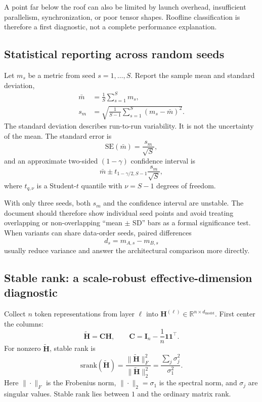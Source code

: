\documentclass[11pt,a4paper]{article}
\theoremstyle{definition}
\theoremstyle{plain}
\newcommand{\mC}{\bm{C}}
\newcommand{\mI}{\bm{I}}
\newcommand{\mH}{\bm{H}}
\newcommand{\reals}{\mathbb{R}}
\newcommand{\dmodel}{d_{\mathrm{model}}}
\begin{document}
A point far below the roof can also be limited by launch overhead, insufficient parallelism, synchronization, or poor tensor shapes. Roofline classification is therefore a first diagnostic, not a complete performance explanation.

\subsection{Statistical reporting across random seeds}
\label{sec:seed-reporting}

Let $m_s$ be a metric from seed $s=1,\ldots,S$. Report the sample mean and standard deviation,
\begin{align}
    \bar m&=\frac{1}{S}\sum_{s=1}^{S}m_s,\\
    s_m&=\sqrt{\frac{1}{S-1}
        \sum_{s=1}^{S}(m_s-\bar m)^2}.
\end{align}
The standard deviation describes run-to-run variability. It is not the uncertainty of the mean. The standard error is
\begin{equation}
    \mathrm{SE}(\bar m)=\frac{s_m}{\sqrt S},
\end{equation}
and an approximate two-sided $(1-\gamma)$ confidence interval is
\begin{equation}
    \bar m\pm t_{1-\gamma/2,S-1}\frac{s_m}{\sqrt S},
\end{equation}
where $t_{q,\nu}$ is a Student-$t$ quantile with $\nu=S-1$ degrees of freedom.

With only three seeds, both $s_m$ and the confidence interval are unstable. The document should therefore show individual seed points and avoid treating overlapping or non-overlapping ``mean $\pm$ SD'' bars as a formal significance test. When variants can share data-order seeds, paired differences
\begin{equation}
    d_s=m_{A,s}-m_{B,s}
\end{equation}
usually reduce variance and answer the architectural comparison more directly.

\subsection{Stable rank: a scale-robust effective-dimension diagnostic}
\label{sec:stable-rank}

Collect $n$ token representations from layer $\ell$ into $\mH^{(\ell)}\in\reals^{n\times\dmodel}$. First center the columns:
\begin{equation}
    \widetilde{\mH}=\mC\mH,
    \qquad
    \mC=\mI_n-\frac{1}{n}\mathbf{1}\mathbf{1}^\top.
\end{equation}
For nonzero $\widetilde{\mH}$, stable rank is
\begin{equation}\label{eq:stable-rank}
    \mathrm{srank}(\widetilde{\mH})
    =\frac{\|\widetilde{\mH}\|_F^2}
           {\|\widetilde{\mH}\|_2^2}
    =\frac{\sum_j\sigma_j^2}{\sigma_1^2}.
\end{equation}
Here $\|\cdot\|_F$ is the Frobenius norm, $\|\cdot\|_2=\sigma_1$ is the spectral norm, and $\sigma_j$ are singular values. Stable rank lies between $1$ and the ordinary matrix rank.
\end{document}
